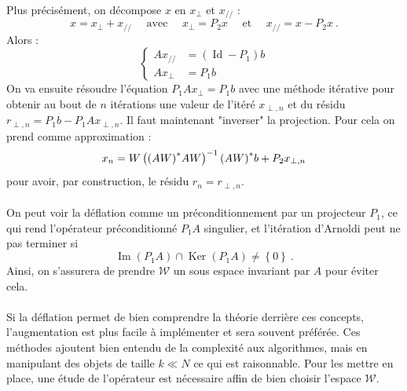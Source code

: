       \paragraph{}
      Plus précisément, on décompose $x$ en $x_\perp$ et $x_{//}$ :
      \[x = x_\perp + x_{//}\quad\text{ avec }\quad x_\perp = P_2x\quad\text{ et }\quad x_{//} = x - P_2x\ .\]
      Alors :
      \begin{equation*}
        \left\{
        \begin{aligned}
          Ax_{//} &= \left(\operatorname{Id} - P_1\right)b \\
          Ax_\perp &= P_1b
        \end{aligned}
        \right.
      \end{equation*}
      On va ensuite résoudre l'équation $P_1Ax_\perp = P_1b$ avec une méthode itérative pour obtenir au bout de $n$ itérations une valeur de l'itéré $x_{\perp, n}$ et du résidu $r_{\perp, n} = P_1b - P_1Ax_{\perp, n}$.
      Il faut maintenant "inverser" la projection.
      Pour cela on prend comme approximation :
      $$x_n = W\left({\left(AW\right)}^*AW\right)^{-1}{\left(AW\right)}^*b + P_2x_{\perp, n}$$
      pour avoir, par construction, le résidu $r_n = r_{\perp, n}$.

      \paragraph{}
      On peut voir la déflation comme un préconditionnement par un projecteur $P_1$, ce qui rend l'opérateur préconditionné $P_1A$ singulier, et l'itération d'Arnoldi peut ne pas terminer si
      \[\operatorname{Im}\left(P_1A\right) \cap \operatorname{Ker}\left(P_1A\right) \neq \left\{0\right\}\ .\]
      Ainsi, on s'assurera de prendre $\mathcal{W}$ un sous espace invariant par $A$ pour éviter cela.


    \paragraph{}
    Si la déflation permet de bien comprendre la théorie derrière ces concepts, l'augmentation est plus facile à implémenter et sera souvent préférée.
    Ces méthodes ajoutent bien entendu de la complexité aux algorithmes, mais en manipulant des objets de taille $k \ll N$ ce qui est raisonnable.
    Pour les mettre en place, une étude de l'opérateur est nécessaire affin de bien choisir l'espace $\mathcal{W}$.


